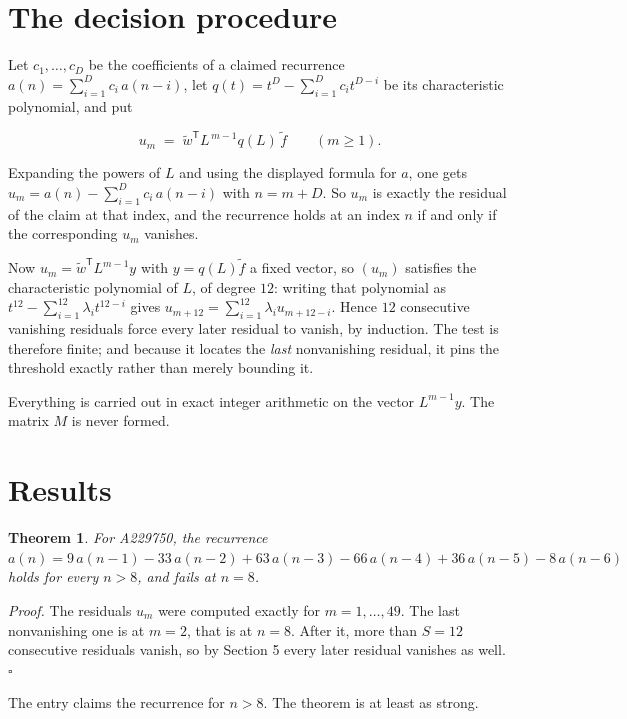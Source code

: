 \documentclass[11pt]{article}
\newtheorem{theorem}{Theorem}
\theoremstyle{definition}
\begin{document}
\section{The decision procedure}

Let $c_1,\dots,c_D$ be the coefficients of a claimed recurrence $a(n) = \sum_{i=1}^{D} c_i\,a(n-i)$, let $q(t) = t^{D} - \sum_{i=1}^{D} c_i t^{D-i}$ be its characteristic polynomial, and put

\[u_m \;=\; \tilde w^{\mathsf T} L^{\,m-1} q(L)\,\tilde f \qquad (m \ge 1).\]

Expanding the powers of $L$ and using the displayed formula for $a$, one gets $u_m = a(n) - \sum_{i=1}^{D} c_i\,a(n-i)$ with $n = m + D$. So $u_m$ is exactly the residual of the claim at that index, and the recurrence holds at an index $n$ if and only if the corresponding $u_m$ vanishes.

Now $u_m = \tilde w^{\mathsf T} L^{m-1} y$ with $y = q(L)\tilde f$ a fixed vector, so $(u_m)$ satisfies the characteristic polynomial of $L$, of degree $12$: writing that polynomial as $t^{12} - \sum_{i=1}^{12} \lambda_i t^{12-i}$ gives $u_{m+12} = \sum_{i=1}^{12} \lambda_i u_{m+12-i}$. Hence $12$ consecutive vanishing residuals force every later residual to vanish, by induction. The test is therefore finite; and because it locates the {\itshape last} nonvanishing residual, it pins the threshold exactly rather than merely bounding it.

Everything is carried out in exact integer arithmetic on the vector $L^{m-1}y$. The matrix $M$ is never formed.

\section{Results}

\begin{theorem} For A229750, the recurrence $a(n) = 9\,a(n-1) - 33\,a(n-2) + 63\,a(n-3) - 66\,a(n-4) + 36\,a(n-5) - 8\,a(n-6)$ holds for every $n > 8$, and fails at $n = 8$.\end{theorem}

{\itshape Proof.} The residuals $u_m$ were computed exactly for $m = 1,\dots,49$. The last nonvanishing one is at $m = 2$, that is at $n = 8$. After it, more than $S = 12$ consecutive residuals vanish, so by Section 5 every later residual vanishes as well. $\square$

The entry claims the recurrence for $n > 8$. The theorem is at least as strong.
\end{document}
